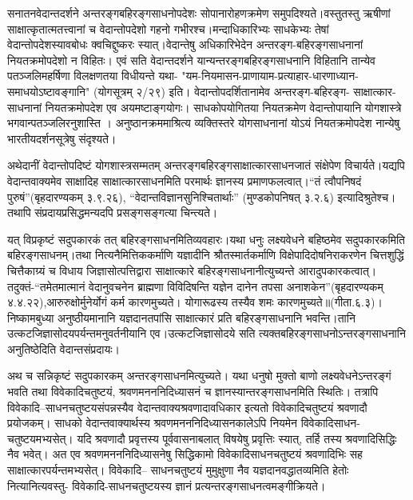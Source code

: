 सनातनवेदान्तदर्शने अन्तरङ्गबहिरङ्गसाधनोपदेशः सोपानारोहणक्रमेण समुपदिश्यते।वस्तुतस्तु ऋषीणां साक्षात्कृतात्मतत्त्वानां च वेदान्तोपदेशो गहनो गभीरश्च।मन्दाधिकारिभ्यः साधकेभ्यः तेषां वेदान्तोपदेशस्यावबोधः क्वचिद्दुष्करः स्यात्।वेदान्तेषु अधिकारिभेदेन अन्तरङ्ग-बहिरङ्गसाधनानां नियतक्रमोपदेशो न विहितः। एवं सति वेदान्तदर्शने यान्यन्तरङ्गबहिरङ्गसाधनानि विहितानि तान्येव पतञ्जलिमहर्षिणा विलक्षणतया विधीयन्ते यथा- "यम-नियमासन-प्राणायाम-प्रत्याहार-धारणाध्यान- समाधयोऽष्टावङ्गानि" (योगसूत्रम् २/२९) इति। वेदान्तोपदर्शितानामेव अन्तरङ्ग-बहिरङ्ग- साक्षात्कार-साधनानां नियतक्रमोपदेश एव अयमष्टाङ्गयोगः। साधकोपयोगितया नियतक्रमेण वेदान्तोपायानि योगशास्त्रे भगवान्पतञ्जलिरनुशास्ति । अनुष्ठानक्रममाश्रित्य व्यक्तिस्तरे योगसाधनानां योऽयं नियतक्रमोपदेश नान्येषु भारतीयदर्शनसूत्रेषु संदृश्यते।

अथेदानीं वेदान्तोपदिष्टं योगशास्त्रसम्मतम् अन्तरङ्गबहिरङ्गसाक्षात्कारसाधनजातं संक्षेपेण विचार्यते।यद्यपि वेदान्तवाक्यमेव साक्षादिह साक्षात्कारसाधनमिति परमार्थः ज्ञानस्य प्रमाणफलत्वात्।“तं त्वौपनिषदं पुरुषं”(बृहदारण्यकम् ३.९.२६), “वेदान्तविज्ञानसुनिश्चितार्थाः” (मुण्डकोपनिषत् ३.२.६) इत्यादिश्रुतेश्च। तथापि संप्रदायप्रसिद्धमन्यदपि प्रसङ्गसङ्गत्या चिन्त्यते।

यत् विप्रकृष्टं सदुपकारकं तत् बहिरङ्गसाधनमितिव्यवहारः।यथा धनुः लक्ष्यवेधने बहिष्ठमेव सदुपकारकमिति बहिरङ्गसाधनम्।तथा नित्यनैमित्तिककर्माणि यज्ञादीनि श्रौतस्मार्तकर्माणि विक्षेपादिदोषनिराकरणेन चित्तशुद्धिं चित्तैकाग्र्यं च विधाय जिज्ञासोत्पत्तिद्वारा साक्षात्कारे बहिरङ्गसाधनानीत्युच्यन्ते आरादुपकारकत्वात्। तदुक्तं-“तमेतमात्मानं वेदानुवचनेन ब्राह्मणा विविदिषन्ति यज्ञेन दानेन तपसा अनाशकेन”(बृहदारण्यकम् ४.४.२२),आरुरुक्षोर्मुनेर्योगं कर्म कारणमुच्यते। योगारूढस्य तस्यैव शमः कारणमुच्यते॥(गीता.६.३)। निष्कामबुध्या अनुष्ठीयमानानि यज्ञदानतपांसि साक्षात्कारं प्रति बहिरङ्गसाधनानि भवन्ति।तानि उत्कटजिज्ञासोदयपर्यन्तमनुवर्तनीयानि एव।उत्कटजिज्ञासोदये सति त्यक्तबहिरङ्गसाधनोऽन्तरङ्गसाधनानि अनुतिष्ठेदिति वेदान्तसंप्रदायः।

अथ च सन्निकृष्टं सदुपकारकम् अन्तरङ्गसाधनमित्युच्यते। यथा धनुषो मुक्तो बाणो लक्ष्यवेधनेऽन्तरङ्गं भवति तथा विवेकादिचतुष्टयं, श्रवणमनननिदिध्यासनं च ज्ञानस्यान्तरङ्गसाधनमिति स्थितिः। तत्रापि विवेकादि–साधनचतुष्टयसंपन्नस्यैव वेदान्तवाक्यश्रवणादावधिकार इत्यतो विवेकादिचतुष्टयं श्रवणादौ प्रयोजकम्। साधको वेदान्तवाक्यार्थस्य श्रवणमनननिदिध्यासनकालेऽपि नियमेन विवेकादिसाधन- चतुष्टयमभ्यसेत्। यदि श्रवणादौ प्रवृत्तस्य पूर्ववासनाबलात् विषयेषु प्रवृत्तिः स्यात्, तर्हि तस्य श्रवणादिसिद्धिः नैव भवेत्। अत एव श्रवणमनननिदिध्यासनेषु सिद्धिकामो विवेकादिसाधनचतुष्टयं श्रवणादिभिः सह साक्षात्कारपर्यन्तमभ्यसेत्। विवेकादि– साधनचतुष्टयं मुमुक्षुणा नैव यज्ञदानवद्धातव्यमिति हेतोः नित्यानित्यवस्तु- विवेकादि-साधनचतुष्टयस्य ज्ञानं प्रत्यन्तरङ्गसाधनत्वमङ्गीक्रियते।

